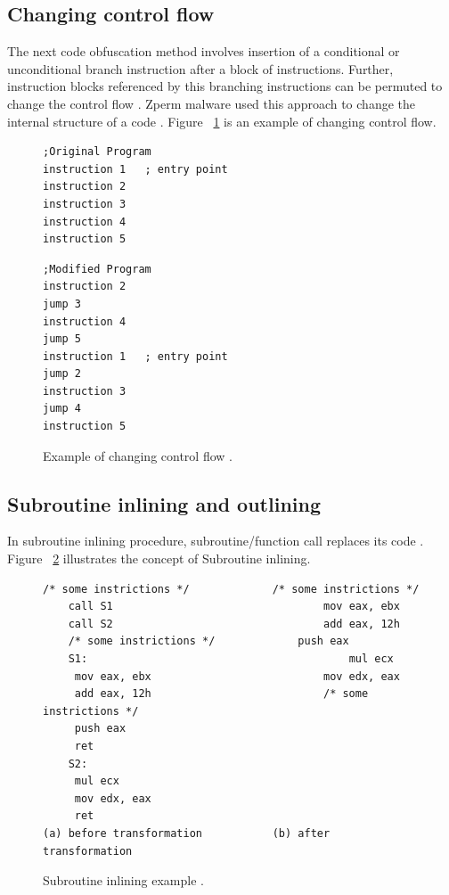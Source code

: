 \subsection{Changing control flow} 
The next code obfuscation method involves insertion of a conditional or unconditional branch instruction after a block of instructions. Further, instruction blocks referenced by this branching instructions can be permuted to change the control flow \cite{bib23}. Zperm malware used this approach to change the internal structure of a code \cite{bib25}. Figure ~\ref{fig:changecntflow} is an example of changing control flow.

\begin{figure}
  \centering
  \begin{lstlisting}[language=myasm]
;Original Program 
instruction 1   ; entry point
instruction 2
instruction 3
instruction 4
instruction 5
\end{lstlisting}

\begin{lstlisting}[language=myasm]
;Modified Program
instruction 2
jump 3
instruction 4
jump 5
instruction 1   ; entry point
jump 2
instruction 3
jump 4
instruction 5
\end{lstlisting}

    \caption[Example of changing control flow]{Example of changing control flow \cite{bib25}.}
    \label{fig:changecntflow}
\end{figure}

\subsection{Subroutine inlining and outlining} 
In subroutine inlining procedure, subroutine/function call replaces its code \cite{bib23}. Figure ~\ref{fig:subroutineinline} illustrates the concept of Subroutine inlining. 

\begin{figure}
  \centering
  \begin{lstlisting}[language=myasm]
	/* some instrictions */				/* some instrictions */ 
	call S1									mov eax, ebx
	call S2									add eax, 12h
	/* some instrictions */				push eax
	S1: 										mul ecx
	 mov eax, ebx							mov edx, eax
	 add eax, 12h							/* some instrictions */
	 push eax					
	 ret						
	S2:							
	 mul ecx
	 mov edx, eax
	 ret
(a) before transformation			(b) after transformation
\end{lstlisting}


    \caption[Subroutine inlining example]{Subroutine inlining example \cite{bib25}.}
    \label{fig:subroutineinline}
\end{figure}


